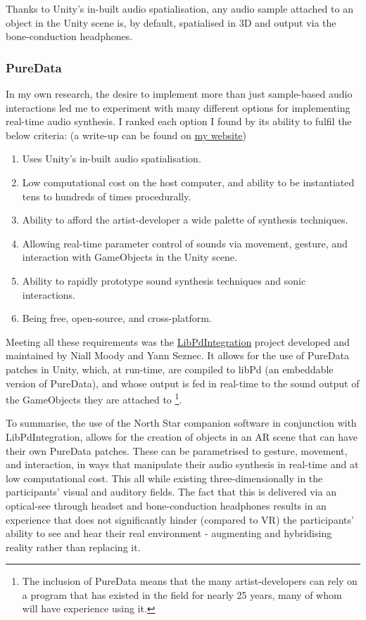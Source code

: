 Thanks to Unity’s in-built audio spatialisation, any audio sample attached to an object in the Unity scene is, by default, spatialised in 3D and output via the bone-conduction headphones.

\subsubsection{PureData}\label{sec: polaris-framework-software-puredata}
In my own research, the desire to implement more than just sample-based audio interactions led me to experiment with many different options for implementing real-time audio synthesis. I ranked each option I found by its ability to fulfil the below criteria: (a write-up can be found on \href{https://sambilbow.github.io/projects/polaris/software.html}{my website})

\begin{enumerate}
    \item Uses Unity’s in-built audio spatialisation.
    \item Low computational cost on the host computer, and ability to be instantiated tens to hundreds of times procedurally.
    \item Ability to afford the artist-developer a wide palette of synthesis techniques.
    \item Allowing real-time parameter control of sounds via movement, gesture, and interaction with GameObjects in the Unity scene.
    \item Ability to rapidly prototype sound synthesis techniques and sonic interactions.
    \item Being free, open-source, and cross-platform.
\end{enumerate}

Meeting all these requirements was the \href{https://github.com/LibPdIntegration/LibPdIntegration}{LibPdIntegration} project developed and maintained by Niall Moody and Yann Seznec. It allows for the use of PureData patches in Unity, which, at run-time, are compiled to libPd (an embeddable version of PureData), and whose output is fed in real-time to the sound output of the GameObjects they are attached to  \footnote{The inclusion of PureData means that the many artist-developers can rely on a program that has existed in the field for nearly 25 years, many of whom will have experience using it.}.

To summarise, the use of the North Star companion software in conjunction with LibPdIntegration, allows for the creation of objects in an AR scene that can have their own PureData patches. These can be parametrised to gesture, movement, and interaction, in ways that manipulate their audio synthesis in real-time and at low computational cost. This all while existing three-dimensionally in the participants’ visual and auditory fields. The fact that this is delivered via an optical-see through headset and bone-conduction headphones results in an experience that does not significantly hinder (compared to VR) the participants’ ability to see and hear their real environment - augmenting and hybridising reality rather than replacing it.



